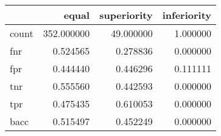 \begin{tabular}{lrrr}
\toprule
{} &       equal &  superiority &  inferiority \\
\midrule
count &  352.000000 &    49.000000 &     1.000000 \\
fnr   &    0.524565 &     0.278836 &     0.000000 \\
fpr   &    0.444440 &     0.446296 &     0.111111 \\
tnr   &    0.555560 &     0.442593 &     0.000000 \\
tpr   &    0.475435 &     0.610053 &     0.000000 \\
bacc  &    0.515497 &     0.452249 &     0.000000 \\
\bottomrule
\end{tabular}
